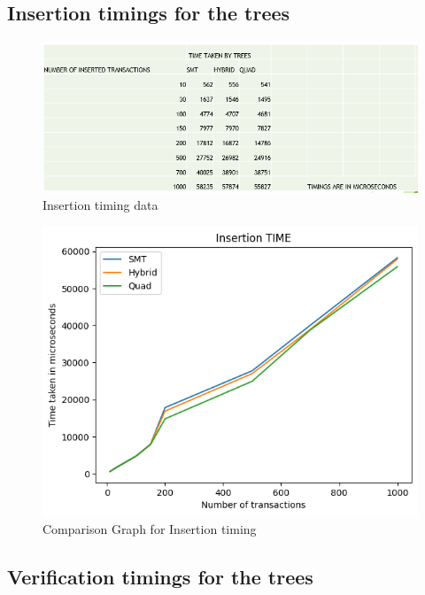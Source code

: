 \subsection{Insertion timings for the trees}

\begin{figure}[H]
    \centering
    \includegraphics[scale=0.8]{figures/Insertion time of tree.png}
    \caption{Insertion timing data}
 
\end{figure}
\vspace{0.5cm}

\vspace{0.5cm}
\begin{figure}[H]
    \centering
    \includegraphics[scale=0.8]{figures/Comparison Graph for Insertion.png}
    \caption{Comparison Graph for Insertion timing}
 
\end{figure}
\vspace{0.5cm}


\subsection{Verification timings for the trees}

